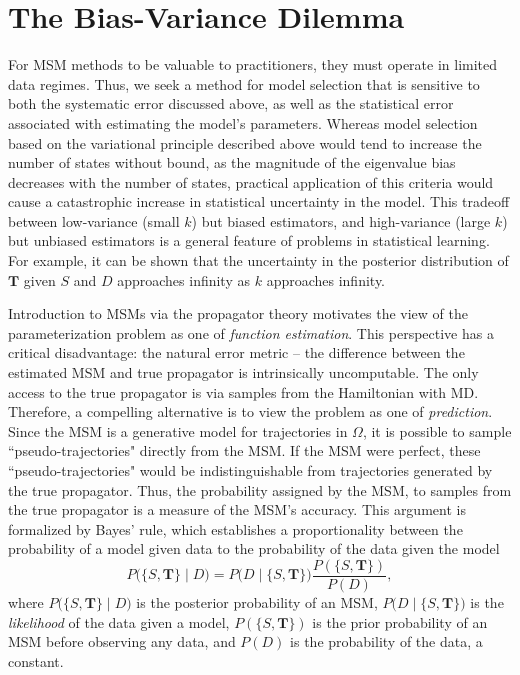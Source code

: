 \documentclass[journal=jpcbfk, layout=traditional, manuscript=article]{achemso}
\begin{document}
\section{The Bias-Variance Dilemma}
For MSM methods to be valuable to practitioners, they must operate in limited data regimes. Thus, we seek a method for model selection that is sensitive to both the systematic error discussed above, as well as the statistical error associated with estimating the model's parameters. Whereas model selection based on the variational principle described above would tend to increase the number of states without bound, as the magnitude of the eigenvalue bias decreases with the number of states, practical application of this criteria would cause a catastrophic increase in statistical uncertainty in the model. This tradeoff between low-variance (small $k$) but biased estimators, and high-variance (large $k$) but unbiased estimators is a general feature of problems in statistical learning\cite{Sammut2010Encyclopedia}. For example, it can be shown that the uncertainty in the posterior distribution of $\mathbf{T}$ given $S$ and $D$ approaches infinity as $k$ approaches infinity.

Introduction to MSMs via the propagator theory motivates the view of the parameterization problem as one of \emph{function estimation}. This perspective has a critical disadvantage: the natural error metric -- the difference between the estimated MSM and true propagator is intrinsically uncomputable. The only access to the true propagator is via samples from the Hamiltonian with MD. Therefore, a compelling alternative is to view the problem as one of \emph{prediction}. Since the MSM is a generative model for trajectories in $\Omega$, it is possible to sample ``pseudo-trajectories" directly from the MSM. If the MSM were perfect, these ``pseudo-trajectories" would be indistinguishable from trajectories generated by the true propagator. Thus, the probability assigned by the MSM, to samples from the true propagator is a measure of the MSM's accuracy. This argument is formalized by Bayes' rule, which establishes a proportionality between the probability of a model given data to the probability of the data given the model
\begin{equation}
\label{eq:bayes}
P\Big(\{S, \mathbf{T}\} \;\Big|\; D\Big) = P\Big(D \;\Big|\; \{S, \mathbf{T}\}\Big) \frac{P(\{S, \mathbf{T}\})}{P(D)},
\end{equation}
where $P\Big(\{S, \mathbf{T}\} \;\Big|\; D\Big)$ is the posterior probability of an MSM, $P\Big(D \;\Big|\; \{S, \mathbf{T}\}\Big)$ is the \emph{likelihood} of the data given a model, $P(\{S, \mathbf{T}\})$ is the prior probability of an MSM before observing any data, and $P(D)$ is the probability of the data, a constant.
\end{document}

